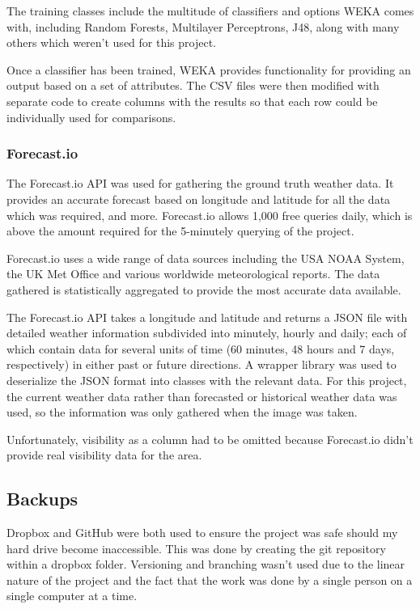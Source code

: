 \documentclass[a4paper,12pt,twoside]{report}
\begin{document}
The training classes include the multitude of classifiers and options WEKA comes with, including Random Forests, Multilayer Perceptrons, J48, along with many others which weren't used for this project.

Once a classifier has been trained, WEKA provides functionality for providing an output based on a set of attributes. The CSV files were then modified with separate code to create columns with the results so that each row could be individually used for comparisons.


\subsubsection{Forecast.io}
The Forecast.io\cite{forecast} API was used for gathering the ground truth weather data. It provides an accurate forecast based on longitude and latitude for all the data which was required, and more. Forecast.io allows 1,000 free queries daily, which is above the amount required for the 5-minutely querying of the project.

Forecast.io uses a wide range of data sources including the USA NOAA System\cite{noaa}, the UK Met Office\cite{metoffice} and various worldwide meteorological reports. The data gathered is statistically aggregated to provide the most accurate data available.

The Forecast.io API takes a longitude and latitude and returns a JSON file with detailed weather information subdivided into minutely, hourly and daily; each of which contain data for several units of time (60 minutes, 48 hours and 7 days, respectively) in either past or future directions. A wrapper\cite{fiowrap} library was used to deserialize the JSON format into classes with the relevant data.
For this project, the current weather data rather than forecasted or historical weather data was used, so the information was only gathered when the image was taken.

Unfortunately, visibility as a column had to be omitted because Forecast.io didn't provide real visibility data for the area.

\subsection{Backups}
Dropbox\cite{dropbox} and GitHub\cite{git} were both used to ensure the project was safe should my hard drive become inaccessible. 
This was done by creating the git repository within a dropbox folder. Versioning and branching wasn't used due to the linear nature of the project and the fact that the work was done by a single person on a single computer at a time.
\end{document}

